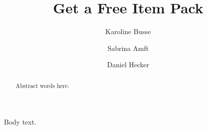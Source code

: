 \author*[1]{Karoline Busse}
\author[2]{Sabrina Amft}
\author[1]{Daniel Hecker}
\title{Get a Free Item Pack}
\maketitle
\begin{abstract}Abstract words here.\end{abstract}
Body text.

